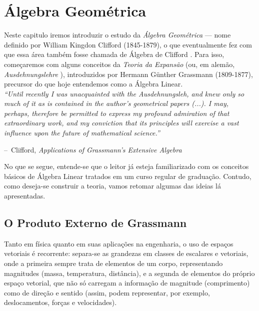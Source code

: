 \documentclass[a4paper,12pt]{report}
\makeatletter
\theoremstyle{plain}
\theoremstyle{definition}
\newenvironment{chapquote}[2][2em]
{\setlength{\@tempdima}{#1}%
	\def\chapquote@author{#2}%
	\parshape 1 \@tempdima \dimexpr\textwidth-2\@tempdima\relax%
	\itshape}
{\par\normalfont\hfill--\ \chapquote@author\hspace*{\@tempdima}\par\bigskip}
\makeatother
\begin{document}
	\newpage
	\section{Álgebra Geométrica}
	
	Neste capitulo iremos introduzir o estudo da \textit{Álgebra Geométrica} --- nome definido por William Kingdon Clifford (1845-1879), o que eventualmente fez com que essa área também fosse chamada de Álgebra de Clifford \cite{sommerGeometric}. Para isso, começaremos com alguns conceitos da \textit{Teoria da Expansão} (ou, em alemão, \textit{Ausdehnungslehre} \cite{grassmannLineale}), introduzidos por Hermann Günther Grassmann (1809-1877), precursor do que hoje entendemos como a Álgebra Linear. 
	\\
	
	
	\begin{chapquote}{Clifford, \textit{Applications of Grassmann's Extensive Algebra} \cite{cliffordApplicationsGrassmannAlgebras}}
		``Until recently I was unacquainted with the Ausdehnungsleh, and knew only so much of it as is contained in the author's geometrical papers (...). I may, perhaps, therefore be permitted to express my profound admiration of that extraordinary work, and my conviction that its principles will exercise a vast influence upon the future of mathematical science.''
	\end{chapquote}

	No que se segue, entende-se que o leitor já esteja familiarizado com os conceitos básicos de Álgebra Linear tratados em um curso regular de graduação. Contudo, como deseja-se construir a teoria, vamos retomar algumas das ideias lá apresentadas. 
	
	\subsection{O Produto Externo de Grassmann}
	
	Tanto em física quanto em suas aplicações na engenharia, o uso de espaços vetoriais é recorrente: separa-se as grandezas em classes de escalares e vetoriais, onde a primeira sempre trata de elementos de um corpo, representando magnitudes (massa, temperatura, distância), e a segunda de elementos do próprio espaço vetorial, que não só carregam a informação de magnitude (comprimento) como de direção e sentido (assim, podem representar, por exemplo, deslocamentos, forças e velocidades).
	
\end{document}
